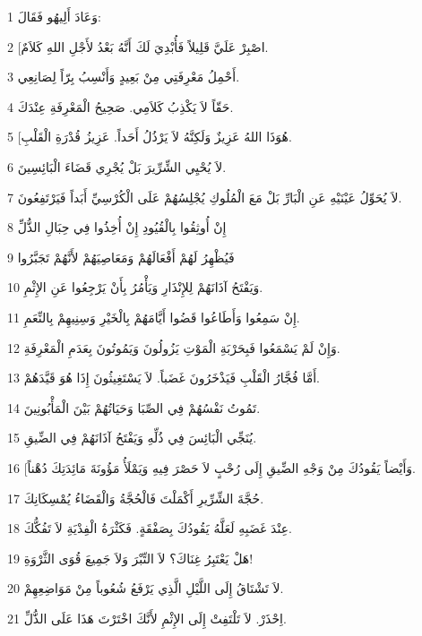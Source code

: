 \par 1 وَعَادَ أَلِيهُو فَقَالَ:
\par 2 [اصْبِرْ عَلَيَّ قَلِيلاً فَأُبْدِيَ لَكَ أَنَّهُ بَعْدُ لأَجْلِ اللهِ كَلاَمٌ.
\par 3 أَحْمِلُ مَعْرِفَتِي مِنْ بَعِيدٍ وَأَنْسِبُ بِرّاً لِصَانِعِي.
\par 4 حَقّاً لاَ يَكْذِبُ كَلاَمِي. صَحِيحُ الْمَعْرِفَةِ عِنْدَكَ.
\par 5 [هُوَذَا اللهُ عَزِيزٌ وَلَكِنَّهُ لاَ يَرْذُلُ أَحَداً. عَزِيزُ قُدْرَةِ الْقَلْبِ.
\par 6 لاَ يُحْيِي الشِّرِّيرَ بَلْ يُجْرِي قَضَاءَ الْبَائِسِينَ.
\par 7 لاَ يُحَوِّلُ عَيْنَيْهِ عَنِ الْبَارِّ بَلْ مَعَ الْمُلُوكِ يُجْلِسُهُمْ عَلَى الْكُرْسِيِّ أَبَداً فَيَرْتَفِعُونَ.
\par 8 إِنْ أُوثِقُوا بِالْقُيُودِ إِنْ أُخِذُوا فِي حِبَالِ الذُّلِّ
\par 9 فَيُظْهِرُ لَهُمْ أَفْعَالَهُمْ وَمَعَاصِيَهُمْ لأَنَّهُمْ تَجَبَّرُوا
\par 10 وَيَفْتَحُ آذَانَهُمْ لِلإِنْذَارِ وَيَأْمُرُ بِأَنْ يَرْجِعُوا عَنِ الإِثْمِ.
\par 11 إِنْ سَمِعُوا وَأَطَاعُوا قَضُوا أَيَّامَهُمْ بِالْخَيْرِ وَسِنِيهِمْ بِالنِّعَمِ.
\par 12 وَإِنْ لَمْ يَسْمَعُوا فَبِحَرْبَةِ الْمَوْتِ يَزُولُونَ وَيَمُوتُونَ بِعَدَمِ الْمَعْرِفَةِ.
\par 13 أَمَّا فُجَّارُ الْقَلْبِ فَيَذْخَرُونَ غَضَباً. لاَ يَسْتَغِيثُونَ إِذَا هُوَ قَيَّدَهُمْ.
\par 14 تَمُوتُ نَفْسُهُمْ فِي الصِّبَا وَحَيَاتُهُمْ بَيْنَ الْمَأْبُونِينَ.
\par 15 يُنَجِّي الْبَائِسَ فِي ذُلِّهِ وَيَفْتَحُ آذَانَهُمْ فِي الضِّيقِ.
\par 16 [وَأَيْضاً يَقُودُكَ مِنْ وَجْهِ الضِّيقِ إِلَى رُحْبٍ لاَ حَصْرَ فِيهِ وَيَمْلَأُ مَؤُونَةَ مَائِدَتِكَ دُهْناً.
\par 17 حُجَّةَ الشِّرِّيرِ أَكْمَلْتَ فَالْحُجَّةُ وَالْقَضَاءُ يُمْسِكَانِكَ.
\par 18 عِنْدَ غَضَبِهِ لَعَلَّهُ يَقُودُكَ بِصَفْقَةٍ. فَكَثْرَةُ الْفِدْيَةِ لاَ تَفُكُّكَ.
\par 19 هَلْ يَعْتَبِرُ غِنَاكَ؟ لاَ التِّبْرَ وَلاَ جَمِيعَ قُوَى الثَّرْوَةِ!
\par 20 لاَ تَشْتَاقُ إِلَى اللَّيْلِ الَّذِي يَرْفَعُ شُعُوباً مِنْ مَوَاضِعِهِمْ.
\par 21 اِحْذَرْ. لاَ تَلْتَفِتْ إِلَى الإِثْمِ لأَنَّكَ اخْتَرْتَ هَذَا عَلَى الذُّلِّ.
